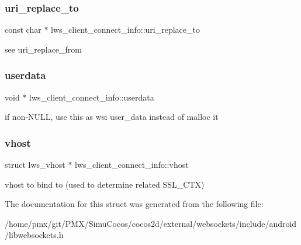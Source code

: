 \subsubsection{\texorpdfstring{uri\+\_\+replace\+\_\+to}{uri\_replace\_to}}
{\footnotesize\ttfamily const char $\ast$ lws\+\_\+client\+\_\+connect\+\_\+info\+::uri\+\_\+replace\+\_\+to}

see uri\+\_\+replace\+\_\+from \mbox{\label{structlws__client__connect__info_a40117288cbea5439b3fc5cd95f1aea3c}} 
\subsubsection{\texorpdfstring{userdata}{userdata}}
{\footnotesize\ttfamily void $\ast$ lws\+\_\+client\+\_\+connect\+\_\+info\+::userdata}

if non-\/\+N\+U\+LL, use this as wsi user\+\_\+data instead of malloc it \mbox{\label{structlws__client__connect__info_a366c69fbb3cc5a4afa75e210905227e0}} 
\subsubsection{\texorpdfstring{vhost}{vhost}}
{\footnotesize\ttfamily struct lws\+\_\+vhost $\ast$ lws\+\_\+client\+\_\+connect\+\_\+info\+::vhost}

vhost to bind to (used to determine related S\+S\+L\+\_\+\+C\+TX) 

The documentation for this struct was generated from the following file\+:\begin{DoxyCompactItemize}
\item 
/home/pmx/git/\+P\+M\+X/\+Simu\+Cocos/cocos2d/external/websockets/include/android/libwebsockets.\+h\end{DoxyCompactItemize}
